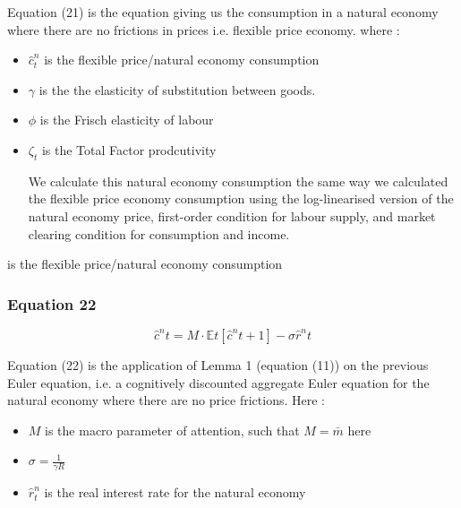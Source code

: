 \documentclass{article}
\begin{document}
Equation (21) is the equation giving us the consumption in a natural economy where there are no frictions in prices i.e. flexible price economy. where :
\begin{itemize}
    \item $\hat{c}_{t}^{n}$ is the flexible price/natural economy consumption 
    \item $\gamma$ is the the elasticity of substitution between goods. 
    \item $\phi$ is the Frisch elasticity of labour
    \item $\zeta_{t}$ is the Total Factor prodcutivity

We calculate this natural economy consumption the same way we calculated the flexible price economy consumption using the log-linearised version of the natural economy price, first-order condition for labour supply, and market clearing condition for consumption and income. 
\end{itemize} is the flexible price/natural economy consumption

\subsubsection*{Equation 22}
\begin{equation}
    \hat{c}^{n}{t} = M\cdot\mathbb{E}{t}\left[\hat{c}^{n}{t+1}\right]-\sigma\hat{r}^{n}{t}
\end{equation}

Equation (22) is the application of Lemma 1 (equation (11)) on the previous Euler equation, i.e. a cognitively discounted aggregate Euler equation for the natural economy where there are no price frictions. Here : 
\begin{itemize}
    \item $M$ is the macro parameter of attention, such that $M=\bar{m}$ here
    \item $\sigma=\frac{1}{\gamma R}$ 
    \item $\hat r_{t}^{n}$ is the real interest rate for the natural economy
\end{itemize}
\end{document}
